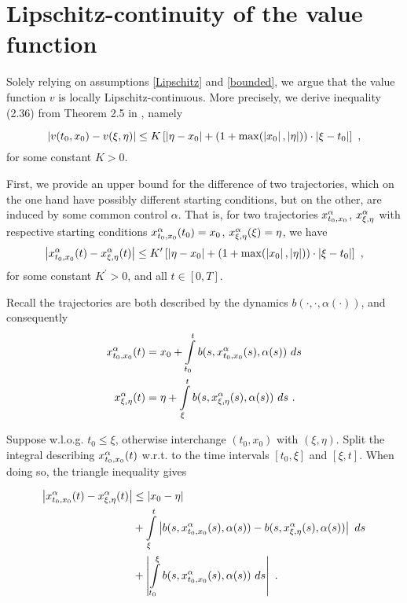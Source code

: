 \section{Lipschitz-continuity of the value function}
\label{value lipschitz}

Solely relying on assumptions \eqref{Lipschitz} and \eqref{bounded}, we argue that the value function $ v $ is locally Lipschitz-continuous. More precisely, we derive inequality (2.36) from Theorem 2.5 in \cite[p.~165]{zhou}, namely

\begin{equation}
	\label{loc lipschitz}
	\left\lvert {v(t_0, x_0)- v(\xi, \eta)} \right\rvert \leq K \left[\left\lvert {\eta - x_0} \right\rvert + (1 + \max(\left\lvert {x_0} \right\rvert, \left\lvert {\eta} \right\rvert)) \cdot \left\lvert {\xi - t_0} \right\rvert \right] \ ,
\end{equation}
for some constant $ K > 0 $. 

First, we provide an upper bound for the difference of two trajectories, which on the one hand have possibly different starting conditions, but on the other, are induced by some common control $ \alpha $. That is, for two trajectories $ x_{t_0, x_0}^{\alpha} $, $ x_{\xi, \eta}^{\alpha} $ with respective starting conditions $ x_{t_0, x_0}^{\alpha}(t_0) = x_0 $, $ x_{\xi, \eta}^{\alpha}(\xi) = \eta $, we have
\begin{equation}
	\label{general gronwall}
	\left\lvert {x_{t_0, x_0}^{\alpha}(t) - x_{\xi, \eta}^{\alpha}(t)} \right\rvert \leq K^{\prime} \left[\left\lvert {\eta - x_0} \right\rvert + (1 + \max(\left\lvert {x_0} \right\rvert, \left\lvert {\eta} \right\rvert)) \cdot \left\lvert {\xi - t_0} \right\rvert \right] \ ,
\end{equation}
for some constant $ K^{\prime} > 0 $, and all $ t \in \left[0, T\right] $.

Recall the trajectories are both described by the dynamics $ b(\cdot, \cdot, \alpha(\cdot)) $, and consequently
\begin{align*}
	x_{t_0, x_0}^{\alpha}(t) &= x_0 + \int\limits_{t_0}^{t} b(s, x_{t_0, x_0}^{\alpha}(s), \alpha(s)) \ ds \\
	x_{\xi, \eta}^{\alpha}(t) &= \eta + \int\limits_{\xi}^{t} b(s, x_{\xi, \eta}^{\alpha}(s), \alpha(s)) \ ds \ .
\end{align*}

Suppose w.l.o.g. $ t_0 \leq \xi $, otherwise interchange $ (t_0, x_0) $ with $ (\xi, \eta) $. Split the integral describing $ x_{t_0, x_0}^{\alpha}(t) $ w.r.t. to the time intervals $ \left[t_0, \xi \right] $ and $ \left[\xi, t\right] $. When doing so, the triangle inequality gives

\begin{equation*}
	\begin{split}
	\left\lvert {x_{t_0, x_0}^{\alpha}(t) - x_{\xi, \eta}^{\alpha}(t)} \right\rvert &\leq \left\lvert {x_0 - \eta } \right\rvert \\
	&+ \int\limits_{\xi}^{t} \left\lvert {b(s, x_{t_0, x_0}^{\alpha}(s), \alpha(s)) - b(s, x_{\xi, \eta}^{\alpha}(s), \alpha(s))} \right\rvert \ ds \\
	&+ \left\lvert {\int\limits_{t_0}^{\xi} b(s, x_{t_0, x_0}^{\alpha}(s), \alpha(s)) \ ds} \right\rvert\ .
	\end{split}
\end{equation*}

